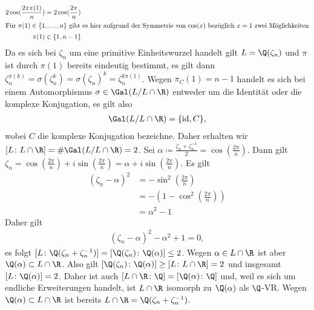 \documentclass{article}
\newcommand{\id}{\operatorname{id}}
\begin{document}
\begin{enumerate}[(a)]
\begin{align*}
            2 \cos(\frac{2\pi \pi(1)}{n}) &= 2\cos(\frac{2\pi}{n})\\
            \intertext{Für $\pi(1) \in \{1, \dots, n\}$ gibt es hier aufgrund der Symmetrie von $\cos(x)$ bezüglich $x = 1$ zwei Möglichkeiten}
            \pi(1) &\in \{1, n-1\} 
        \end{align*}
        Da es sich bei $\zeta_n$ um eine primitive Einheitswurzel handelt gilt $L = \Q(\zeta_n)$ und $\pi$ ist durch $\pi(1)$ bereits eindeutig bestimmt,
        es gilt dann $\zeta_n^{\pi(k)} = \sigma(\zeta_n^k) = \sigma(\zeta_n)^k = \zeta_n^{k \pi(1)}$.
        Wegen $\pi_C(1) = n-1$ handelt es sich bei einem Automorphismus $\sigma \in \Gal(L/L\cap \R)$ 
        entweder um die Identität oder die komplexe Konjugation, es gilt also
        \begin{align*}
            \Gal(L/L\cap \R) = \{\id, C\},
        \end{align*}
        wobei $C$ die komplexe Konjugation bezeichne.
        Daher erhalten wir $[L\colon L\cap \R] = \# \Gal(L/L\cap \R) = 2$.
        Sei $\alpha \coloneqq \frac{\zeta_n + \zeta_n^{-1}}{2} = \cos(\frac{2\pi}{n})$.
        Dann gilt $\zeta_n = \cos(\frac{2\pi}{n}) + i \sin(\frac{2\pi}{n}) = \alpha + i\sin(\frac{2\pi}{n})$.
        Es gilt 
        \begin{align*}
            (\zeta_n - \alpha)^2 &= - \sin^2(\frac{2\pi}{n})\\
            &= - (1 - \cos^2(\frac{2\pi}{n}))\\
            &= \alpha^2 - 1
        \end{align*}
        Daher gilt
        \begin{align*}
            (\zeta_n - \alpha)^2 - \alpha^2 + 1 = 0,
        \end{align*}
        es folgt $[L\colon \Q(\zeta_n + \zeta_n^{-1})] = [\Q(\zeta_n) \colon \Q(\alpha)] \leq 2$.
        Wegen $\alpha \in L \cap \R$ ist aber $\Q(\alpha) \subset L\cap \R$. Also gilt 
        $[\Q(\zeta_n) \colon \Q(\alpha)] \geq [L \colon L \cap \R] = 2$ und insgesamt $[L \colon \Q(\alpha)] = 2$.
        Daher ist auch $[L \cap \R \colon \Q] = [\Q(\alpha) \colon \Q]$ und,
        weil es sich um endliche Erweiterungen handelt, ist $L\cap \R$ isomorph zu $\Q(\alpha)$ als $\Q$-VR.
        Wegen $\Q(\alpha) \subset L\cap \R$ ist bereits $L \cap \R = \Q(\zeta_n + \zeta_n^{-1})$.
    \end{enumerate} 
\end{document}
